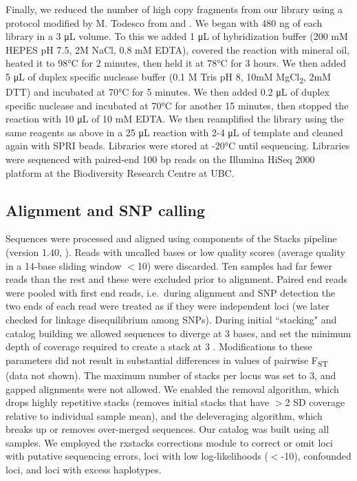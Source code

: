\documentclass{article}
\begin{document}
Finally, we reduced the number of high copy fragments from our library using a protocol modified by M. Todesco from \cite{shagina2010normalization} and \cite{matvienko2013consequences}. We began with 480 ng of each library in a 3 \si{\micro\liter} volume. To this we added 1 \si{\micro\liter} of hybridization buffer (200 mM HEPES pH 7.5, 2M NaCl, 0.8 mM EDTA), covered the reaction with mineral oil, heated it to 98\si{\degree}C for 2 minutes, then held it at 78\si{\degree}C for 3 hours. We then added 5 \si{\micro\liter} of duplex specific nuclease buffer (0.1 M Tris pH 8, 10mM MgCl\textsubscript{2}, 2mM DTT) and incubated at 70\si{\degree}C for 5 minutes. We then added 0.2 \si{\micro\liter} of duplex specific nuclease and incubated at 70\si{\degree}C for another 15 minutes, then stopped the reaction with 10 \si{\micro\liter} of 10 mM EDTA. We then reamplified the library using the same reagents as above in a 25 \si{\micro\liter} reaction with 2-4 \si{\micro\liter} of template and cleaned again with SPRI beads. Libraries were stored at -20\si{\degree}C until sequencing. Libraries were sequenced with paired-end 100 bp reads on the Illumina HiSeq 2000 platform at the Biodiversity Research Centre at UBC.

\subsection*{Alignment and SNP calling}

Sequences were processed and aligned using components of the Stacks pipeline (version 1.40, \citealp{catchen2011stacks, catchen2013stacks}). Reads with uncalled bases or low quality scores (average quality in a 14-base sliding window $<$10) were discarded. Ten samples had far fewer reads than the rest and these were excluded prior to alignment. Paired end reads were pooled with first end reads, i.e.\ during alignment and SNP detection the two ends of each read were treated as if they were independent loci (we later checked for linkage disequilibrium among SNPs). During initial ``stacking" and catalog building we allowed sequences to diverge at 3 bases, and set the minimum depth of coverage required to create a stack at 3 \citep{rochette2017deriving}. Modifications to these parameters did not result in substantial differences in values of pairwise F\textsubscript{ST} (data not shown). The maximum number of stacks per locus was set to 3, and gapped alignments were not allowed. We enabled the removal algorithm, which drops highly repetitive stacks (removes initial stacks that have $>$2 SD coverage relative to individual sample mean), and the deleveraging algorithm, which breaks up or removes over-merged sequences. Our catalog was built using all samples. We employed the rxstacks corrections module to correct or omit loci with putative sequencing errors, loci with low log-likelihoods ($<$-10), confounded loci, and loci with excess haplotypes.
\end{document}
